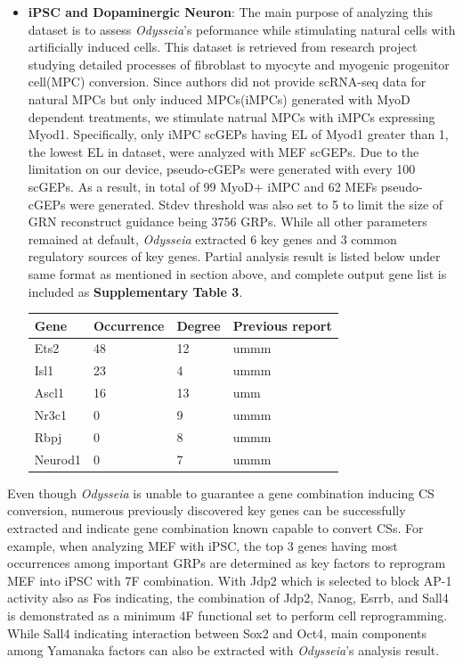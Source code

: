 \documentclass[fleqn,10pt]{wlscirep}
\begin{document}
\begin{itemize}
\item \textbf{iPSC and Dopaminergic Neuron}:
The main purpose of analyzing this dataset is to assess \emph{Odysseia}'s peformance while stimulating natural cells with artificially induced cells.
This dataset is retrieved from research project studying detailed processes of fibroblast to myocyte and myogenic progenitor cell(MPC) conversion.\cite{ips_neuron_ascl1}
Since authors did not provide scRNA-seq data for natural MPCs but only induced MPCs(iMPCs) generated with MyoD dependent treatments, we stimulate natrual MPCs with iMPCs expressing Myod1.
Specifically, only iMPC scGEPs having EL of Myod1 greater than 1, the lowest EL in dataset, were analyzed with MEF scGEPs.
Due to the limitation on our device, pseudo-cGEPs were generated with every 100 scGEPs.
As a result, in total of 99 MyoD+ iMPC and 62 MEFs pseudo-cGEPs were generated.
Stdev threshold was also set to 5 to limit the size of GRN reconstruct guidance being 3756 GRPs.
While all other parameters remained at default, \emph{Odysseia} extracted 6 key genes and 3 common regulatory sources of key genes.
Partial analysis result is listed below under same format as mentioned in section above, and complete output gene list is included as \textbf{Supplementary Table 3}.

\begin{table}[ht]
\centering
\begin{tabular}{|l|l|l|l|}
\hline
\textbf{Gene} & \textbf{Occurrence} & \textbf{Degree} & \textbf{Previous report}  \\
\hline
Ets2 & 48 & 12 & ummm\cite{} \\
\hline
Isl1 & 23 & 4 & ummm\cite{}\\
\hline
Ascl1 & 16 & 13 & umm\cite{ips_neuron_ascl1} \\
\hline
Nr3c1 & 0 & 9 & ummm\cite{}\\
\hline
Rbpj & 0 & 8 & ummm\cite{}\\
\hline
Neurod1 & 0 & 7 & ummm\cite{ips_neuron_ascl1} \\
\hline
\end{tabular}
\end{table}

\end{itemize}

Even though \emph{Odysseia} is unable to guarantee a gene combination inducing CS conversion, numerous previously discovered key genes can be successfully extracted and indicate gene combination known capable to convert CSs.
For example, when analyzing MEF with iPSC, the top 3 genes having most occurrences among important GRPs are determined as key factors to reprogram MEF into iPSC with 7F combination\cite{ips7f}.
With Jdp2 which is selected to block AP-1 activity also as Fos indicating, the combination of Jdp2, Nanog, Esrrb, and Sall4 is demonstrated as a minimum 4F functional set to perform cell reprogramming\cite{ips7f}.
While Sall4 indicating interaction between Sox2 and Oct4\cite{sall4_oct4_sox2}, main components among Yamanaka factors\cite{yamanaka_2006, osk} can also be extracted with \emph{Odysseia}'s analysis result.
\end{document}
